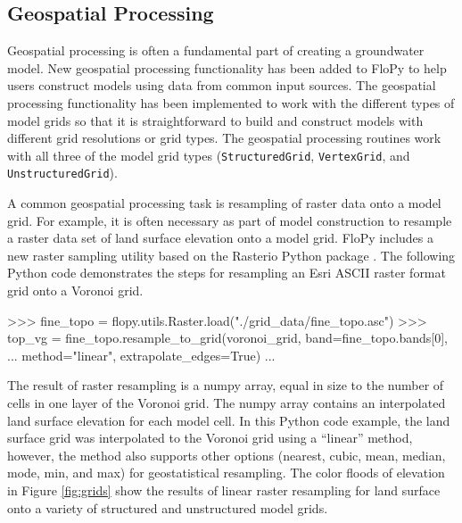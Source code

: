 \documentclass[12pt, oneside]{article}  	%
\begin{document}
\subsection*{Geospatial Processing}

Geospatial processing is often a fundamental part of creating a groundwater model. New geospatial processing functionality has been added to FloPy to help users construct models using data from common input sources. The geospatial processing functionality has been implemented to work with the different types of model grids so that it is straightforward to build and construct models with different grid resolutions or grid types. The geospatial processing routines work with all three of the model grid types (\texttt{StructuredGrid}, \texttt{VertexGrid}, and \texttt{UnstructuredGrid}). 

A common geospatial processing task is resampling of raster data onto a model grid. For example, it is often necessary as part of model construction to resample a raster data set of land surface elevation onto a model grid. FloPy includes a new raster sampling utility based on the Rasterio Python package \citep{gillies_2019}. The following Python code demonstrates the steps for resampling an Esri ASCII raster format grid onto a Voronoi grid.

\begin{python}
>>> fine_topo = flopy.utils.Raster.load("./grid_data/fine_topo.asc")
>>> top_vg = fine_topo.resample_to_grid(voronoi_grid, band=fine_topo.bands[0],
... method="linear", extrapolate_edges=True)
...
\end{python}

\noindent The result of raster resampling is a numpy array, equal in size to the number of cells in one layer of the Voronoi grid. The numpy array contains an interpolated land surface elevation for each model cell. In this Python code example, the land surface grid was interpolated to the Voronoi grid using a ``linear'' method, however, the method also supports other options (nearest, cubic, mean, median, mode, min, and max) for geostatistical resampling. The color floods of elevation in Figure \ref{fig:grids} show the results of linear raster resampling for land surface onto a variety of structured and unstructured model grids.
\end{document}

